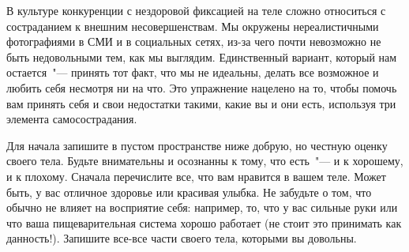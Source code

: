  \label{Ex:Embracing_Our_Bodies_with_Self-Compassion}

В культуре конкуренции с нездоровой фиксацией на теле сложно относиться с состраданием к внешним несовершенствам. Мы окружены нереалистичными фотографиями в СМИ и в социальных сетях, из-за чего почти невозможно не быть недовольными тем, как мы выглядим. Единственный вариант, который нам остается~"--- принять тот факт, что мы не идеальны, делать все возможное и любить себя несмотря ни на что. Это упражнение нацелено на то, чтобы помочь вам принять себя и свои недостатки такими, какие вы и они есть, используя три элемента самосострадания.

\begin{itemize}
	\itemWritingHand Для начала запишите в пустом пространстве ниже добрую, но честную оценку своего тела. Будьте внимательны и осознанны к тому, что есть~"--- и к хорошему, и к плохому. Сначала перечислите все, что вам нравится в вашем теле. Может быть, у вас отличное здоровье или красивая улыбка. Не забудьте о том, что обычно не влияет на восприятие себя: например, то, что у вас сильные руки или что ваша пищеварительная система хорошо работает (не стоит это принимать как данность!). Запишите все-все части своего тела, которыми вы довольны. 
\end{itemize}

